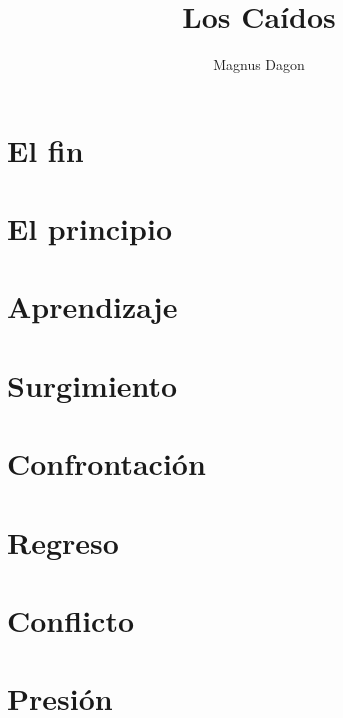 \documentclass[11pt,a5paper]{book}
\title{Los Caídos}
\author{Magnus Dagon}
\date{}
\begin{document}


\frontmatter
\maketitle

\thispagestyle{empty}


\tableofcontents

\mainmatter
\chapter{El fin}\label{chapter:el_fin}


\chapter{El principio}\label{chapter:el_principio}


\chapter{Aprendizaje}\label{chapter:aprendizaje}


\chapter{Surgimiento}\label{chapter:surgimiento}


\chapter{Confrontación}\label{chapter:confrontacion}


\chapter{Regreso}\label{chapter:regreso}


\chapter{Conflicto}\label{chapter:conflicto}


\chapter{Presión}\label{chapter:presion}

\end{document}

